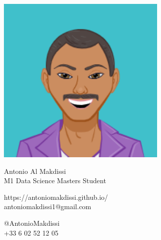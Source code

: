 \documentclass{article}
\begin{document}
\centering \includegraphics[width=.25\linewidth]{logo}\\[5pt]
\parbox{2in}{\Large \centering Antonio Al Makdissi\\[1pt]
\normalsize M1 Data Science Masters Student}

\vfill
\raggedright
\begin{multicols}{2}
https://antoniomakdissi.github.io/\\
antoniomakdissi1@gmail.com

\columnbreak
\raggedleft
@AntonioMakdissi\\
+33 6 02 52 12 05%
\end{multicols}%
\end{document}
